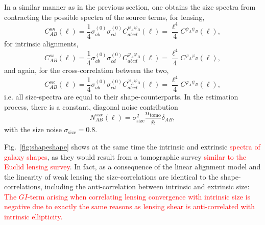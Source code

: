 \documentclass[a4paper,fleqn,usenatbib]{mnras}
\newcommand\spirou[1]{\textcolor{red}{#1}}
\newcommand\BG[1]{\textcolor{red}{#1}}
\begin{document}
In a similar manner as in the previous section, one obtains the size spectra from contracting the possible spectra of the source terms, for lensing,
\begin{equation}
C^{\kappa\kappa}_{AB}(\ell) = \frac{1}{4}\sigma^{(0)}_{ab}\sigma^{(0)}_{cd}C^{\psi_A\psi_B}_{abcd}(\ell) = \frac{\ell^4}{4}C^{\psi_A\psi_B}(\ell),
\end{equation}
for intrinsic alignments,
\begin{equation}
C^{ss}_{AB}(\ell) = \frac{1}{4}\sigma^{(0)}_{ab}\sigma^{(0)}_{cd}C^{\varphi_A\varphi_B}_{abcd}(\ell) = \frac{\ell^4}{4}C^{\varphi_A\varphi_B}(\ell),
\end{equation}
and again, for the cross-correlation between the two,
\begin{equation}
C^{s\kappa}_{AB}(\ell) = \frac{1}{4}\sigma^{(0)}_{ab}\sigma^{(0)}_{cd}C^{\varphi_A\psi_B}_{abcd}(\ell) = \frac{\ell^4}{4}C^{\varphi_A\psi_B}(\ell),
\end{equation}
i.e. all size-spectra are equal to their shape-counterparts. In the estimation process, there is a constant, diagonal noise contribution
\begin{equation}
N_{AB}^\mathrm{size}(\ell) = \sigma^2_\mathrm{size} \frac{n_\mathrm{tomo}}{\bar{n}}\delta_{AB},
\end{equation}
with the size noise $\sigma_\mathrm{size} = 0.8$.

Fig.~\ref{fig:shapeshape} shows at the same time the intrinsic and extrinsic \BG{spectra of galaxy shapes}, as they would result from a tomographic survey \spirou{similar to the Euclid lensing survey}. In fact, as a consequence of the linear alignment model and the linearity of weak lensing the size-correlations are identical to the shape-correlations, including the anti-correlation between intrinsic and extrinsic size: \spirou{The $GI$-term arising when correlating lensing convergence with intrinsic size is negative due to exactly the same reasons as lensing shear is anti-correlated with intrinsic ellipticity.} 
\end{document}
